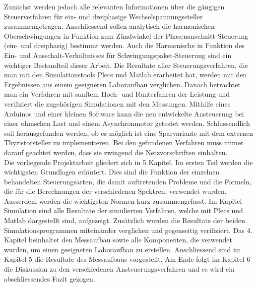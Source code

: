 Zunächst werden jedoch alle relevanten Informationen über die gängigen Steuerverfahren für ein- und dreiphasige Wechselspannungssteller zusammengetragen. Anschliessend sollen analytisch die harmonischen Oberschwingungen in Funktion zum Zündwinkel der Phasenanschnitt-Steuerung (ein- und dreiphasig) bestimmt werden. Auch die Harmonische in Funktion des Ein- und Ausschalt-Verhältnisses für Schwingungspaket-Steuerung sind ein wichtiger Bestandteil dieser Arbeit. Die Resultate aller Steuerungsverfahren, die man mit den Simulationstools Plecs und Matlab erarbeitet hat, werden mit den Ergebnissen aus einem geeigneten Laboraufbau verglichen. Danach betrachtet man ein Verfahren mit sanftem Hoch- und Runterfahren der Leistung und verifiziert die zugehörigen Simulationen mit den Messungen. Mithilfe eines Arduinos und einer kleinen Software kann die neu entwickelte Ansteuerung bei einer ohmschen Last und einem Asynchronmotor getestet werden. Schlussendlich soll herausgefunden werden, ob es möglich ist eine Sparvariante mit dem externen Thyristorsteller zu implementieren. Bei den gefundenen Verfahren muss immer darauf geachtet werden, dass sie zwingend die Netzvorschriften einhalten.\\
Die vorliegende Projektarbeit gliedert sich in 5 Kapitel. Im ersten Teil werden die wichtigsten Grundlagen erläutert. Dies sind die Funktion der einzelnen behandelten Steuerungsarten, die damit auftretenden Probleme und die Formeln, die für die Berechnungen der verschiedenen Spektren, verwendet wurden. Ausserdem werden die wichtigsten Normen kurz zusammengefasst. Im Kapitel Simulation sind alle Resultate der simulierten Verfahren, welche mit Plecs und Matlab dargestellt sind, aufgezeigt. Zusätzlich wurden die Resultate der beiden Simulationsprogrammen miteinander verglichen und gegenseitig verifiziert. Das 4. Kapitel beinhaltet den Messaufbau sowie alle Komponenten, die verwendet wurden, um einen geeigneten Laboraufbau zu erstellen. Anschliessend sind im Kapitel 5 die Resultate des Messaufbaus vorgestellt. Am Ende folgt im Kapitel 6 die Diskussion zu den verschiedenen Ansteuerungsverfahren und es wird ein abschliessendes Fazit gezogen.






















